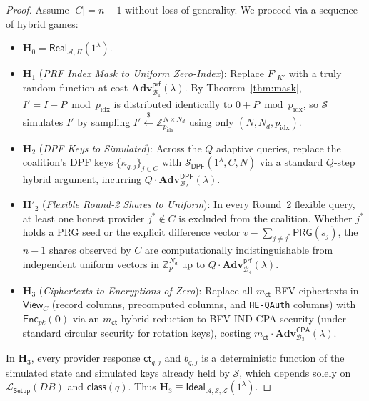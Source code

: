 \documentclass[11pt,a4paper]{article}
\begin{document}
\begin{proof}
Assume $|C| = n - 1$ without loss of generality. We proceed via a sequence of hybrid games:
\begin{itemize}\setlength{\itemsep}{2pt}\setlength{\parskip}{0pt}
    \item $\mathbf{H}_0 = \mathsf{Real}_{\mathcal{A},\Pi}(1^\lambda)$.
    \item $\mathbf{H}_1$ (\textit{PRF Index Mask to Uniform Zero-Index}): Replace $F'_{K'}$ with a truly random function at cost $\mathbf{Adv}^{\mathsf{prf}}_{\mathcal{B}_1}(\lambda)$. By Theorem~\ref{thm:mask}, $I' = I + P \bmod p_{\mathrm{idx}}$ is distributed identically to $0 + P \bmod p_{\mathrm{idx}}$, so $\mathcal{S}$ simulates $I'$ by sampling $I' \xleftarrow{\$} \mathbb{Z}_{p_{\mathrm{idx}}}^{N \times N_d}$ using only $(N, N_d, p_{\mathrm{idx}})$.
    \item $\mathbf{H}_2$ (\textit{DPF Keys to Simulated}): Across the $Q$ adaptive queries, replace the coalition's DPF keys $\{\kappa_{q,j}\}_{j \in C}$ with $\mathcal{S}_{\mathsf{DPF}}(1^\lambda, C, N)$ via a standard $Q$-step hybrid argument, incurring $Q \cdot \mathbf{Adv}^{\mathsf{DPF}}_{\mathcal{B}_2}(\lambda)$.
    \item $\mathbf{H}'_2$ (\textit{Flexible Round-2 Shares to Uniform}): In every Round~2 flexible query, at least one honest provider $j^* \notin C$ is excluded from the coalition. Whether $j^*$ holds a PRG seed or the explicit difference vector $v - \sum_{j \neq j^*} \mathsf{PRG}(s_j)$, the $n-1$ shares observed by $C$ are computationally indistinguishable from independent uniform vectors in $\mathbb{Z}_p^{N_d}$ up to $Q \cdot \mathbf{Adv}^{\mathsf{prf}}_{\mathcal{B}_4}(\lambda)$.
    \item $\mathbf{H}_3$ (\textit{Ciphertexts to Encryptions of Zero}): Replace all $m_{\mathsf{ct}}$ BFV ciphertexts in $\mathsf{View}_C$ (record columns, precomputed columns, and \texttt{HE-QAuth} columns) with $\mathsf{Enc}_{pk}(\mathbf{0})$ via an $m_{\mathsf{ct}}$-hybrid reduction to BFV IND-CPA security (under standard circular security for rotation keys), costing $m_{\mathsf{ct}} \cdot \mathbf{Adv}^{\mathsf{CPA}}_{\mathcal{B}_3}(\lambda)$.
\end{itemize}
In $\mathbf{H}_3$, every provider response $\mathsf{ct}_{q,j}$ and $b_{q,j}$ is a deterministic function of the simulated state and simulated keys already held by $\mathcal{S}$, which depends solely on $\mathcal{L}_{\mathsf{Setup}}(DB)$ and $\mathsf{class}(q)$. Thus $\mathbf{H}_3 \equiv \mathsf{Ideal}_{\mathcal{A},\mathcal{S},\mathcal{L}}(1^\lambda)$.
\end{proof}
\end{document}
